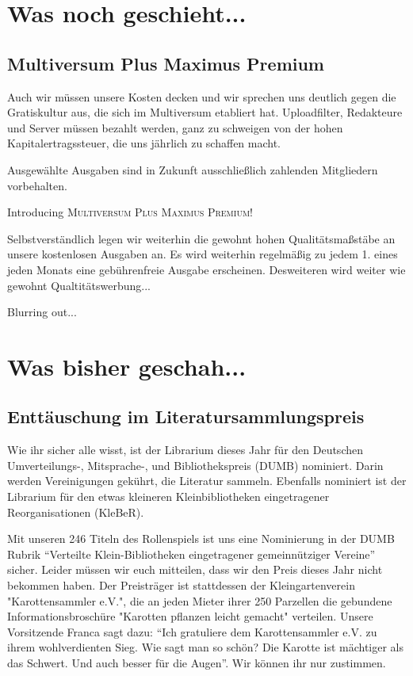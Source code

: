 \documentclass[final]{multiversum}
\begin{document}
\makemultititle
%


\section{Was noch geschieht...}

\subsection{Multiversum Plus Maximus Premium}
Auch wir müssen unsere Kosten decken und wir sprechen uns deutlich gegen die Gratiskultur aus, die sich im Multiversum etabliert hat. Uploadfilter, Redakteure und Server müssen bezahlt werden, ganz zu schweigen von der hohen Kapitalertragssteuer, die uns jährlich zu schaffen macht.

Ausgewählte Ausgaben sind in Zukunft ausschließlich zahlenden Mitgliedern vorbehalten.
\begin{center}Introducing \textsc{Multiversum Plus Maximus Premium!}\end{center}

Selbstverständlich legen wir weiterhin die gewohnt hohen Qualitätsmaßstäbe an unsere kostenlosen Ausgaben an.
Es wird weiterhin regelmäßig zu jedem 1. eines jeden Monats eine gebührenfreie Ausgabe erscheinen.
Desweiteren wird weiter wie gewohnt Qualtitätswerbung...

Blurring out...

\section{Was bisher geschah...}

\subsection{Enttäuschung im Literatursammlungspreis}
Wie ihr sicher alle wisst, ist der Librarium dieses Jahr für den Deutschen Umverteilungs-, Mitsprache-, und Bibliothekspreis (DUMB) nominiert.
Darin werden Vereinigungen gekührt, die Literatur sammeln.
Ebenfalls nominiert ist der Librarium für den etwas kleineren Kleinbibliotheken eingetragener Reorganisationen (KleBeR).

Mit unseren 246 Titeln des Rollenspiels ist uns eine Nominierung in der DUMB Rubrik \enquote{Verteilte Klein-Bibliotheken eingetragener gemeinnütziger Vereine} sicher.
Leider müssen wir euch mitteilen, dass wir den Preis dieses Jahr nicht bekommen haben.
Der Preisträger ist stattdessen der Kleingartenverein "Karottensammler e.V.", die an jeden Mieter ihrer 250 Parzellen die gebundene Informationsbroschüre "Karotten pflanzen leicht gemacht" verteilen.
Unsere Vorsitzende Franca sagt dazu: \enquote{Ich gratuliere dem Karottensammler e.V. zu ihrem wohlverdienten Sieg. 
Wie sagt man so schön? Die Karotte ist mächtiger als das Schwert. Und auch besser für die Augen}.
Wir können ihr nur zustimmen.
\end{document}
